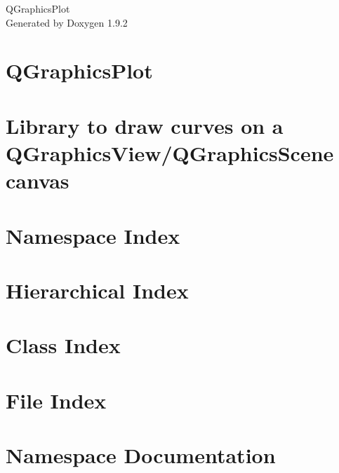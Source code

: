 \documentclass[twoside]{book}
\newcommand{\+}{\discretionary{\mbox{\scriptsize$\hookleftarrow$}}{}{}}
\newcommand{\clearemptydoublepage}{%
    \newpage{\pagestyle{empty}\cleardoublepage}%
  }
\begin{document}
  \raggedbottom
  \begin{titlepage}
  \vspace*{7cm}
  \begin{center}%
  {\Large QGraphics\+Plot}\\
  \vspace*{1cm}
  {\large Generated by Doxygen 1.9.2}\\
  \end{center}
  \end{titlepage}
  \clearemptydoublepage
  \tableofcontents
  \clearemptydoublepage
\chapter{QGraphics\+Plot}
\label{index}
\chapter{Library to draw curves on a QGraphics\+View/\+QGraphics\+Scene canvas}
\label{md_README}

\chapter{Namespace Index}

\chapter{Hierarchical Index}

\chapter{Class Index}

\chapter{File Index}

\chapter{Namespace Documentation}


\end{document}
